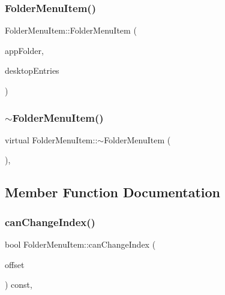 \subsubsection{\texorpdfstring{Folder\+Menu\+Item()}{FolderMenuItem()}}
{\footnotesize\ttfamily Folder\+Menu\+Item\+::\+Folder\+Menu\+Item (\begin{DoxyParamCaption}\item[{const \mbox{\hyperlink{structAppConfigFile_1_1AppFolder}{App\+Config\+File\+::\+App\+Folder}} \&}]{app\+Folder,  }\item[{\mbox{\hyperlink{classDesktopEntries}{Desktop\+Entries}} \&}]{desktop\+Entries }\end{DoxyParamCaption})}

\mbox{\label{classFolderMenuItem_a2052273d4ba80b0bb922a936a41b3f85}} 
\subsubsection{\texorpdfstring{$\sim$\+Folder\+Menu\+Item()}{~FolderMenuItem()}}
{\footnotesize\ttfamily virtual Folder\+Menu\+Item\+::$\sim$\+Folder\+Menu\+Item (\begin{DoxyParamCaption}{ }\end{DoxyParamCaption})\hspace{0.3cm}{\ttfamily [inline]}, {\ttfamily [virtual]}}



\subsection{Member Function Documentation}
\mbox{\label{classFolderMenuItem_a61111b596d78f912bc1573c1ee1d356f}} 
\subsubsection{\texorpdfstring{can\+Change\+Index()}{canChangeIndex()}}
{\footnotesize\ttfamily bool Folder\+Menu\+Item\+::can\+Change\+Index (\begin{DoxyParamCaption}\item[{int}]{offset }\end{DoxyParamCaption}) const\hspace{0.3cm}{\ttfamily [override]}, {\ttfamily [virtual]}}


